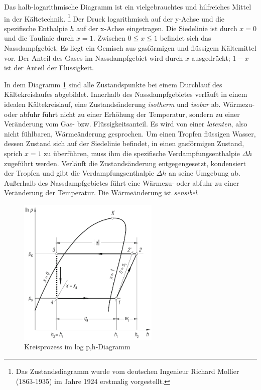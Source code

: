 Das halb-logarithmische Diagramm ist ein vielgebrauchtes und hilfreiches Mittel in der Kältetechnik. 
\footnote{Das Zustandsdiagramm wurde vom deutschen Ingenieur Richard Mollier (1863-1935) im Jahre 1924 erstmalig vorgestellt.} 
Der Druck logarithmisch auf der y-Achse und die spezifische Enthalpie $h$ auf der x-Achse eingetragen. Die Siedelinie ist durch $x = 0$ und die Taulinie durch $x = 1$. Zwischen $0\leqq x\leqq 1$ befindet sich das Nassdampfgebiet. Es liegt ein Gemisch aus gasförmigen und flüssigem Kältemittel vor. Der Anteil des Gases im Nassdampfgebiet wird durch $x$ ausgedrückt; $1-x$ ist der Anteil der Flüssigkeit.


In dem Diagramm \ref{fig:Komponeneten und p-h-Diagramm} sind alle Zustandspunkte bei einem Durchlauf des Kältekreislaufes abgebildet. Innerhalb des Nassdampfgebietes verläuft in einem idealen Kältekreislauf, eine Zustandsänderung \textit{isotherm} und \textit{isobar} ab. Wärmezu- oder abfuhr führt nicht zu einer Erhöhung der Temperatur, sondern zu einer Veränderung vom Gas- bzw. Flüssigkeitsanteil. Es wird von einer \textit{latenten}, also nicht fühlbaren,  Wärmeänderung gesprochen. Um einen Tropfen flüssigen Wasser, dessen Zustand sich auf der Siedelinie befindet, in einen gasförmigen Zustand, sprich $x=1$ zu überführen, muss ihm die spezifische Verdampfungsenthalpie $\Delta h$ zugeführt werden. Verläuft die Zustandsänderung entgegengesetzt, kondensiert der Tropfen und gibt die Verdampfungsenthalpie $\Delta h$ an seine Umgebung ab. 
Außerhalb des Nassdampfgebietes führt eine Wärmezu- oder abfuhr zu einer Veränderung der Temperatur. Die Wärmeänderung ist \textit{sensibel}. 

\begin{figure}[htb]
\centering		
\includegraphics[width=0.6\textwidth]{Pictures/log_p_h_Beahr.png}
\caption{Kreisprozess im log p,h-Diagramm \citep{Baehr2013}}
\label{fig:Komponeneten und p-h-Diagramm}
\end{figure}


